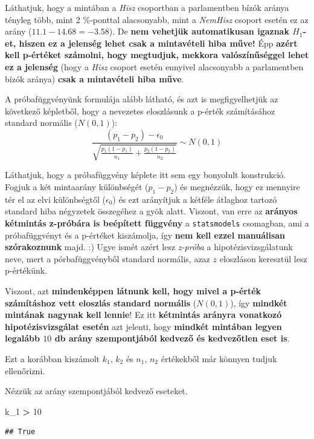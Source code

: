 \documentclass[
]{book}
\newenvironment{Shaded}{\begin{snugshade}}{\end{snugshade}}
\newcommand{\DecValTok}[1]{\textcolor[rgb]{0.00,0.00,0.81}{#1}}
\newcommand{\NormalTok}[1]{#1}
\newcommand{\OperatorTok}[1]{\textcolor[rgb]{0.81,0.36,0.00}{\textbf{#1}}}
\begin{document}
Láthatjuk, hogy a mintában a \emph{Hisz} csoportban a parlamentben bízók aránya tényleg több, mint 2 \%-ponttal alacsonyabb, mint a \emph{NemHisz} csoport esetén ez az arány (\(11.1-14.68=-3.58\)). De \textbf{nem vehetjük automatikusan igaznak \(H_1\)-et, hiszen ez a jelenség lehet csak a mintavételi hiba műve!} Épp \textbf{azért kell p-értéket számolni, hogy megtudjuk, mekkora valószínűséggel lehet ez a jelenség} (hogy a \emph{Hisz} csoport esetén ennyivel alacsonyabb a parlamentben bízók aránya) \textbf{csak a mintavételi hiba műve}.

A próbafüggvényünk formulája alább látható, és azt is megfigyelhetjük az következő képletből, hogy a nevezetes eloszlásunk a p-érték számításához standard normális (\(N(0,1)\)): \[\frac{(p_1-p_2)-\epsilon_0}{\sqrt{\frac{p_1(1-p_1)}{n_1}+\frac{p_2(1-p_2)}{n_2}}} \sim N(0,1)\]

Láthatjuk, hogy a próbafüggvény képlete itt sem egy bonyolult konstrukció. Fogjuk a két mintaarány különbségét (\(p_1-p_2\)) és megnézzük, hogy ez mennyire tér el az elvi különbségtől (\(\epsilon_0\)) és ezt arányítjuk a kétféle átlaghoz tartozó standard hiba négyzetek összegéhez a gyök alatt. Viszont, van erre az \textbf{arányos kétmintás z-próbára is beépített függvény} a \texttt{statsmodels} csomagban, ami a próbafüggvényt és a p-értéket kiszámolja, így \textbf{nem kell ezzel manuálisan szórakoznunk} majd. :)
Ugye ismét azért lesz \emph{z-próba} a hipotézisvizsgálatunk neve, mert a pórbafüggvényből standard normális, azaz \(z\) eloszláson keresztül lesz p-értékünk.

Viszont, azt \textbf{mindenképpen látnunk kell, hogy mivel a p-érték számításhoz vett eloszlás standard normális} (\(N(0,1)\)), így \textbf{mindkét mintának nagynak kell lennie}! Ez itt \textbf{kétmintás arányra vonatkozó hipotézisvizsgálat esetén} azt jelenti, hogy \textbf{mindkét mintában legyen legalább \(10\) db arány szempontjából kedvező és kedvezőtlen eset is}.

Ezt a korábban kiszámolt \(k_1\), \(k_2\) és \(n_1\), \(n_2\) értékekből már könnyen tudjuk ellenőrizni.

Nézzük az arány szempontjából kedvező eseteket.

\begin{Shaded}
\begin{Highlighting}[]
\NormalTok{k\_1 }\OperatorTok{\textgreater{}} \DecValTok{10}
\end{Highlighting}
\end{Shaded}

\begin{verbatim}
## True
\end{verbatim}
\end{document}
